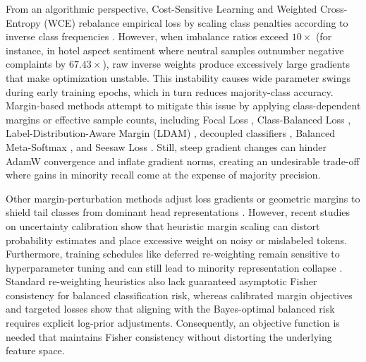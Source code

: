 \documentclass[10pt,journal,compsoc]{IEEEtran}
\begin{document}
From an algorithmic perspective, Cost-Sensitive Learning and Weighted Cross-Entropy (WCE) rebalance empirical loss by scaling class penalties according to inverse class frequencies \cite{zhang2023deep, alshammari2022long}. However, when imbalance ratios exceed $10\times$ (for instance, in hotel aspect sentiment where neutral samples outnumber negative complaints by $67.43\times$), raw inverse weights produce excessively large gradients that make optimization unstable. This instability causes wide parameter swings during early training epochs, which in turn reduces majority-class accuracy. Margin-based methods attempt to mitigate this issue by applying class-dependent margins or effective sample counts, including Focal Loss \cite{lin2017focal}, Class-Balanced Loss \cite{cui2019class}, Label-Distribution-Aware Margin (LDAM) \cite{cao2019learning}, decoupled classifiers \cite{kang2021exploring}, Balanced Meta-Softmax \cite{ren2020balanced}, and Seesaw Loss \cite{wang2021seesaw}. Still, steep gradient changes can hinder AdamW convergence and inflate gradient norms, creating an undesirable trade-off where gains in minority recall come at the expense of majority precision.

Other margin-perturbation methods adjust loss gradients or geometric margins to shield tail classes from dominant head representations \cite{kini2021vector, samuel2021distributional, park2022majority, hong2021disentangling}. However, recent studies on uncertainty calibration \cite{guo2017calibration, minderer2021revisiting, zhong2021improving, wang2023margin} show that heuristic margin scaling can distort probability estimates and place excessive weight on noisy or mislabeled tokens. Furthermore, training schedules like deferred re-weighting remain sensitive to hyperparameter tuning and can still lead to minority representation collapse \cite{thrampoulidis2022imbalance, fang2021exploring}. Standard re-weighting heuristics also lack guaranteed asymptotic Fisher consistency for balanced classification risk, whereas calibrated margin objectives \cite{menon2021longtail, wang2023margin} and targeted losses \cite{li2022targeted} show that aligning with the Bayes-optimal balanced risk requires explicit log-prior adjustments. Consequently, an objective function is needed that maintains Fisher consistency without distorting the underlying feature space.
\end{document}
